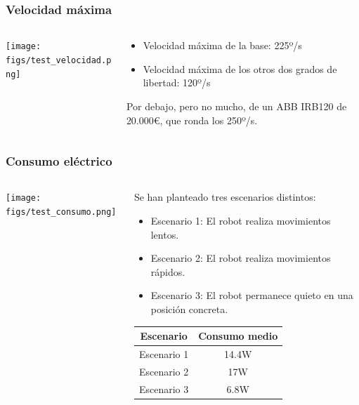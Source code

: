 \documentclass{beamer}
\begin{document}
\begin{frame}
  \frametitle{Velocidad máxima}
  \begin{columns}
    \begin{column}{0.35\textwidth} %
      \texttt{[image: figs/test\_velocidad.png]}
    \end{column}
    \begin{column}{0.5\textwidth} %
      
      \begin{itemize}
        \item Velocidad máxima de la base: 225º/s
        \item Velocidad máxima de los otros dos grados de libertad: 120º/s
      \end{itemize}

      Por debajo, pero no mucho, de un ABB IRB120 de 20.000\euro, que ronda los 
      250º/s.
      \end{column}
  \end{columns}
\end{frame}


\begin{frame}
  \frametitle{Consumo eléctrico}
  \begin{columns}
    \begin{column}{0.35\textwidth} %
      \texttt{[image: figs/test\_consumo.png]}
    \end{column}
    \begin{column}{0.5\textwidth} %
      
      Se han planteado tres escenarios distintos:
      \begin{itemize}
        \item Escenario 1: El robot realiza movimientos lentos.
        \item Escenario 2: El robot realiza movimientos rápidos.
        \item Escenario 3: El robot permanece quieto en una posición concreta.
      \end{itemize}
      \begin{table}[H]
        \begin{center}
        \begin{tabular}{|c|c|}
        \hline
        \textbf{Escenario} & \textbf{Consumo medio}\\
        \hline
        Escenario 1 & 14.4W\\
        Escenario 2 & 17W\\
        Escenario 3 & 6.8W\\
        \hline
        \end{tabular}
        \end{center}
        \end{table}
      \end{column}
  \end{columns}
\end{frame}
\end{document}
